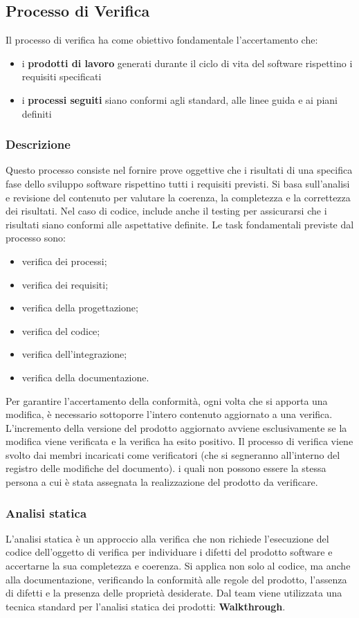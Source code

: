 \subsection{Processo di Verifica}
\label{subsec:proc_verifica}
Il processo di verifica ha come obiettivo fondamentale l'accertamento che:
\begin{itemize}
    \item i \textbf{prodotti di lavoro} generati durante il ciclo di vita del software rispettino i requisiti specificati
    \item i \textbf{processi seguiti} siano conformi agli standard, alle linee guida e ai piani definiti
\end{itemize}
\subsubsection{Descrizione}
Questo processo consiste nel fornire prove oggettive che i risultati di una specifica fase dello sviluppo software rispettino tutti i requisiti previsti. 
Si basa sull’analisi e revisione del contenuto per valutare la coerenza, la completezza e la correttezza dei risultati. Nel caso di codice, include anche il testing per assicurarsi che i risultati siano conformi alle aspettative definite.
Le task fondamentali previste dal processo sono:
\begin{itemize}
    \item verifica dei processi;
    \item verifica dei requisiti;
    \item verifica della progettazione;
    \item verifica del codice;
    \item verifica dell'integrazione;
    \item verifica della documentazione.
\end{itemize}
Per garantire l'accertamento della conformità, ogni volta che si apporta una modifica, è necessario sottoporre l'intero contenuto aggiornato a una verifica. 
L'incremento della versione del prodotto aggiornato avviene esclusivamente se la modifica viene verificata e la verifica ha esito positivo.
Il processo di verifica viene svolto dai membri incaricati come verificatori (che si segneranno all'interno del registro delle modifiche del documento). 
i quali non possono essere la stessa persona a cui è stata assegnata la realizzazione del prodotto da verificare.
\subsubsection{Analisi statica}
L'analisi statica è un approccio alla verifica che non richiede l'esecuzione del codice dell'oggetto di verifica per individuare i difetti del prodotto software 
e accertarne la sua completezza e coerenza.
Si applica non solo al codice, ma anche alla documentazione, verificando la conformità alle regole del prodotto, l'assenza di difetti e la presenza delle proprietà desiderate.
Dal team viene utilizzata una tecnica standard per l'analisi statica dei prodotti: \textbf{Walkthrough}.
